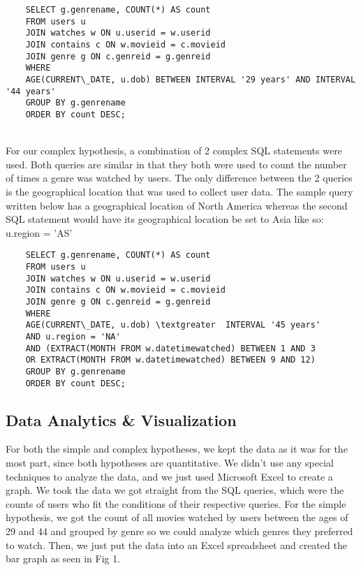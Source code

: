 \documentclass[12pt]{article}
\begin{document}
\begin{verbatim}
    SELECT g.genrename, COUNT(*) AS count
    FROM users u
    JOIN watches w ON u.userid = w.userid
    JOIN contains c ON w.movieid = c.movieid
    JOIN genre g ON c.genreid = g.genreid
    WHERE 
    AGE(CURRENT\_DATE, u.dob) BETWEEN INTERVAL '29 years' AND INTERVAL '44 years'
    GROUP BY g.genrename
    ORDER BY count DESC;
\end{verbatim}
\\

For our complex hypothesis, a combination of 2 complex SQL statements were used. Both queries are similar in that they both were used to count the number of times a genre was watched by users. The only difference between the 2 queries is the geographical location that was used to collect user data. The sample query written below has a geographical location of North America whereas the second SQL statement would have its geographical location be set to Asia like so: u.region = 'AS'\\
\begin{verbatim}
    SELECT g.genrename, COUNT(*) AS count
    FROM users u
    JOIN watches w ON u.userid = w.userid
    JOIN contains c ON w.movieid = c.movieid
    JOIN genre g ON c.genreid = g.genreid
    WHERE
    AGE(CURRENT\_DATE, u.dob) \textgreater  INTERVAL '45 years'
    AND u.region = 'NA'
    AND (EXTRACT(MONTH FROM w.datetimewatched) BETWEEN 1 AND 3 
    OR EXTRACT(MONTH FROM w.datetimewatched) BETWEEN 9 AND 12)
    GROUP BY g.genrename
    ORDER BY count DESC;
\end{verbatim} 

\subsection{Data Analytics \& Visualization}

For both the simple and complex hypotheses, we kept the data as it was for the most part, since both hypotheses are quantitative. We didn't use any special techniques to analyze the data, and we just used Microsoft Excel to create a graph. We took the data we got straight from the SQL queries, which were the counts of users who fit the conditions of their respective queries. For the simple hypothesis, we got the count of all movies watched by users between the ages of 29 and 44 and grouped by genre so we could analyze which genres they preferred to watch. Then, we just put the data into an Excel spreadsheet and created the bar graph as seen in Fig 1.
\end{document}
